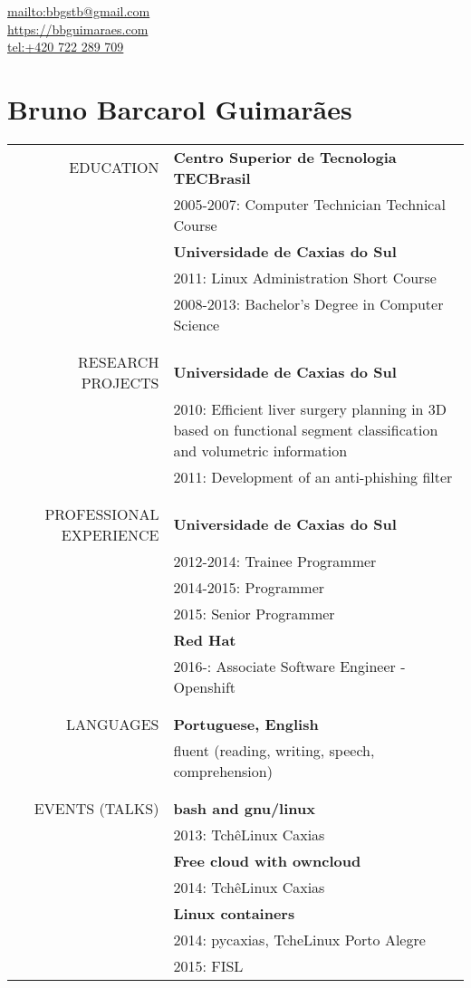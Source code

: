 \begin{flushright}
    \url{mailto:bbgstb@gmail.com} \\
    \url{https://bbguimaraes.com} \\
    \url{tel:+420 722 289 709}
\end{flushright}

\vspace{2\baselineskip}
\section*{Bruno Barcarol Guimarães}
\bigskip

\begin{tabular}{rp{12cm}}
    \uppercase{Education}
    & \textbf{Centro Superior de Tecnologia TECBrasil} \\
    & 2005-2007: Computer Technician Technical Course \\
    & \textbf{Universidade de Caxias do Sul} \\
    & 2011: Linux Administration Short Course \\
    & 2008-2013: Bachelor's Degree in Computer Science
    \\\\ \hline \\
    \uppercase{Research projects}
    & \textbf{Universidade de Caxias do Sul} \\
    & 2010:
        Efficient liver surgery planning in 3D based on functional segment
        classification and volumetric information \\
    & 2011: Development of an anti-phishing filter
    \\\\ \hline \\
    \uppercase{Professional experience}
    & \textbf{Universidade de Caxias do Sul} \\
    & 2012-2014: Trainee Programmer \\
    & 2014-2015: Programmer \\
    & 2015: Senior Programmer \\
    & \textbf{Red Hat} \\
    & 2016-: Associate Software Engineer - Openshift
    \\\\ \hline \\
    \uppercase{Languages}
    & \textbf{Portuguese, English} \\
    & fluent (reading, writing, speech, comprehension)
    \\\\ \hline \\
    \uppercase{Events (talks)}
    & \textbf{bash and gnu/linux} \\
    & 2013: TchêLinux Caxias \\
    & \textbf{Free cloud with owncloud} \\
    & 2014: TchêLinux Caxias \\
    & \textbf{Linux containers} \\
    & 2014: pycaxias, TcheLinux Porto Alegre \\
    & 2015: FISL
\end{tabular}
